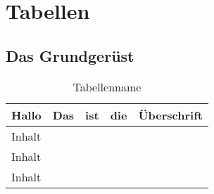 \section{Tabellen}

\subsection{Das Grundgerüst}
\begin{table}[h]
\begin{tabular}{l|l|l|l|l}
Hallo  & Das & ist & die & Überschrift \\ \hline
Inhalt &     &     &     &             \\
Inhalt &     &     &     &             \\
Inhalt &     &     &     &            
\end{tabular}
\caption{Tabellenname}
\end{table}

